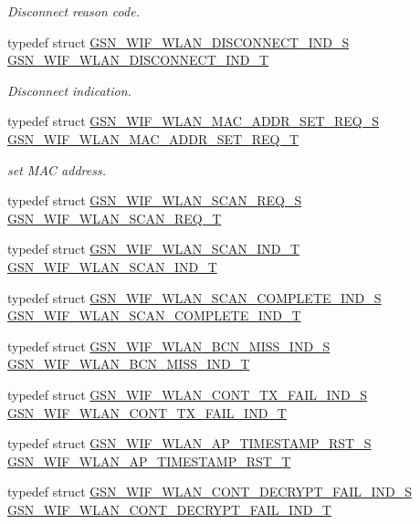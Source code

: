 \begin{DoxyCompactItemize}
\begin{DoxyCompactList}\small\item\em Disconnect reason code. \end{DoxyCompactList}\item 
typedef struct \hyperlink{a00379}{GSN\_\-WIF\_\-WLAN\_\-DISCONNECT\_\-IND\_\-S} \hyperlink{a00677_ga12e53679e526d82e7e99a05a000dbdf8}{GSN\_\-WIF\_\-WLAN\_\-DISCONNECT\_\-IND\_\-T}
\begin{DoxyCompactList}\small\item\em Disconnect indication. \end{DoxyCompactList}\item 
typedef struct \hyperlink{a00388}{GSN\_\-WIF\_\-WLAN\_\-MAC\_\-ADDR\_\-SET\_\-REQ\_\-S} \hyperlink{a00677_ga013826a17b7a57eb4c9e4de16a91b6a7}{GSN\_\-WIF\_\-WLAN\_\-MAC\_\-ADDR\_\-SET\_\-REQ\_\-T}
\begin{DoxyCompactList}\small\item\em set MAC address. \end{DoxyCompactList}\item 
typedef struct \hyperlink{a00402}{GSN\_\-WIF\_\-WLAN\_\-SCAN\_\-REQ\_\-S} \hyperlink{a00677_ga3cb348310b077a03e1bc3f51a82dd842}{GSN\_\-WIF\_\-WLAN\_\-SCAN\_\-REQ\_\-T}
\item 
typedef struct \hyperlink{a00400}{GSN\_\-WIF\_\-WLAN\_\-SCAN\_\-IND\_\-T} \hyperlink{a00677_ga819e3d944fbed5505b12c711a018e6d5}{GSN\_\-WIF\_\-WLAN\_\-SCAN\_\-IND\_\-T}
\item 
typedef struct \hyperlink{a00399}{GSN\_\-WIF\_\-WLAN\_\-SCAN\_\-COMPLETE\_\-IND\_\-S} \hyperlink{a00677_ga211b533548257cf9bdfbb28798c2ffbd}{GSN\_\-WIF\_\-WLAN\_\-SCAN\_\-COMPLETE\_\-IND\_\-T}
\item 
typedef struct \hyperlink{a00371}{GSN\_\-WIF\_\-WLAN\_\-BCN\_\-MISS\_\-IND\_\-S} \hyperlink{a00677_ga8a5916f083421df057ab0d516ee4034d}{GSN\_\-WIF\_\-WLAN\_\-BCN\_\-MISS\_\-IND\_\-T}
\item 
typedef struct \hyperlink{a00377}{GSN\_\-WIF\_\-WLAN\_\-CONT\_\-TX\_\-FAIL\_\-IND\_\-S} \hyperlink{a00677_ga4ad9eacce4bc92ca4ff0473b8d2f7a48}{GSN\_\-WIF\_\-WLAN\_\-CONT\_\-TX\_\-FAIL\_\-IND\_\-T}
\item 
typedef struct \hyperlink{a00369}{GSN\_\-WIF\_\-WLAN\_\-AP\_\-TIMESTAMP\_\-RST\_\-S} \hyperlink{a00677_ga45e197f3f0f8cc4176dbca34e5476b44}{GSN\_\-WIF\_\-WLAN\_\-AP\_\-TIMESTAMP\_\-RST\_\-T}
\item 
typedef struct \hyperlink{a00376}{GSN\_\-WIF\_\-WLAN\_\-CONT\_\-DECRYPT\_\-FAIL\_\-IND\_\-S} \hyperlink{a00677_gaf09a1811aabefafb86e8871fe79ddd6a}{GSN\_\-WIF\_\-WLAN\_\-CONT\_\-DECRYPT\_\-FAIL\_\-IND\_\-T}

\end{DoxyCompactItemize}
